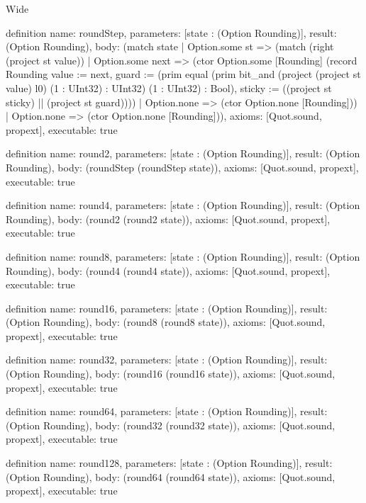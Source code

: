 \begin{lexlean}{Wide}
\begin{semanticmodule}
definition{
  name: roundStep,
  parameters: [state : (Option Rounding)],
  result: (Option Rounding),
  body: (match state
    | Option.some st => (match (right (project st value))
      | Option.some next => (ctor Option.some [Rounding] (record Rounding {value := next, guard := (prim equal (prim bit_and (project (project st value) l0) (1 : UInt32) : UInt32) (1 : UInt32) : Bool), sticky := ((project st sticky) || (project st guard))}))
      | Option.none => (ctor Option.none [Rounding]))
    | Option.none => (ctor Option.none [Rounding])),
  axioms: [Quot.sound, propext],
  executable: true
}

definition{
  name: round2,
  parameters: [state : (Option Rounding)],
  result: (Option Rounding),
  body: (roundStep (roundStep state)),
  axioms: [Quot.sound, propext],
  executable: true
}

definition{
  name: round4,
  parameters: [state : (Option Rounding)],
  result: (Option Rounding),
  body: (round2 (round2 state)),
  axioms: [Quot.sound, propext],
  executable: true
}

definition{
  name: round8,
  parameters: [state : (Option Rounding)],
  result: (Option Rounding),
  body: (round4 (round4 state)),
  axioms: [Quot.sound, propext],
  executable: true
}

definition{
  name: round16,
  parameters: [state : (Option Rounding)],
  result: (Option Rounding),
  body: (round8 (round8 state)),
  axioms: [Quot.sound, propext],
  executable: true
}

definition{
  name: round32,
  parameters: [state : (Option Rounding)],
  result: (Option Rounding),
  body: (round16 (round16 state)),
  axioms: [Quot.sound, propext],
  executable: true
}

definition{
  name: round64,
  parameters: [state : (Option Rounding)],
  result: (Option Rounding),
  body: (round32 (round32 state)),
  axioms: [Quot.sound, propext],
  executable: true
}

definition{
  name: round128,
  parameters: [state : (Option Rounding)],
  result: (Option Rounding),
  body: (round64 (round64 state)),
  axioms: [Quot.sound, propext],
  executable: true
}


\end{semanticmodule}
\end{lexlean}
